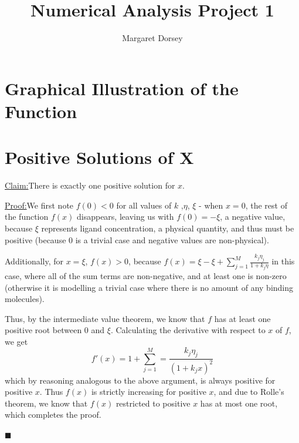 \documentclass[11pt]{article} %
\title{Numerical Analysis Project 1}
\author{Margaret Dorsey}
\newenvironment{claim}[1]{\par\noindent\underline{Claim:}\space#1}{}
\newenvironment{proof}[1]{\par\noindent\underline{Proof:}\space#1}{\hfill $\blacksquare$}
\begin{document}
\maketitle

\section*{Graphical Illustration of the Function}

\section*{Positive Solutions of X}


\begin{claim}
There is exactly one positive solution for $x$.
\end{claim}
\begin{proof}

We first note $f(0) < 0$ for all values of $k$ ,$\eta$, $\xi$ - when $x = 0$, the rest of the function $f(x)$ disappears, leaving us with $f(0) = -\xi$, a negative value, because $\xi$ represents ligand concentration, a physical quantity, and thus must be positive (because $0$ is a trivial case and negative values are non-physical).
\par Additionally, for $x = \xi$, $f(x) > 0$, because $f(x) = \xi - \xi + \sum_{j=1}^{M} \frac{k_j \eta_j}{1+k_j\eta}$ in this case, where all of the sum terms are non-negative, and at least one is non-zero (otherwise it is modelling a trivial case where there is no amount of any binding molecules).
\par Thus, by the intermediate value theorem, we know that $f$ has at least one positive root between $0$ and $\xi$. Calculating the derivative with respect to $x$ of $f$, we get
	$$f'(x) = 1 + \sum_{j=1}^{M} = \frac{k_j \eta_j}{(1+k_jx)^2}$$
which by reasoning analogous to the above argument, is always positive for positive $x$. Thus $f(x)$ is strictly increasing for positive $x$, and due to Rolle's theorem, we know that $f(x)$ restricted to positive $x$ has at most one root, which completes the proof.

\end{proof}
\end{document}
